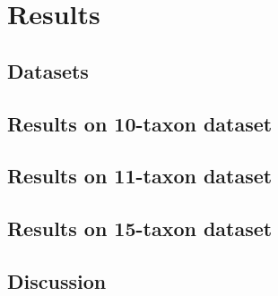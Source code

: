 \section{Results}
\subsection{Datasets}
\subsection{Results on 10-taxon dataset}
\subsection{Results on 11-taxon dataset}
\subsection{Results on 15-taxon dataset}
\subsection{Discussion}